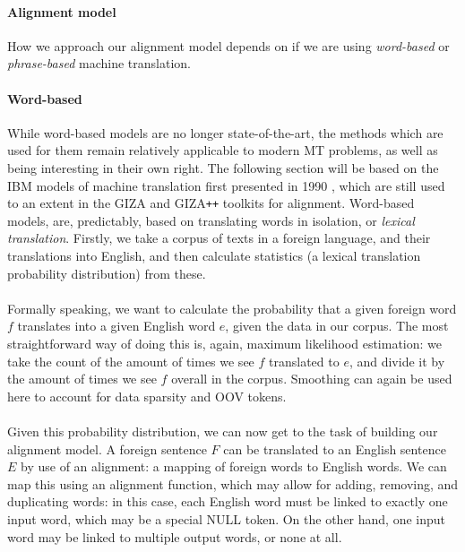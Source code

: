 
 \paragraph{Alignment model}{How we approach our alignment model
   depends on if we are using {\it word-based} or {\it phrase-based}
   machine translation.\cite{smt}}
 \paragraph{Word-based}{While word-based models are no longer
   state-of-the-art, the methods which are used for them remain
   relatively applicable to modern MT problems, as well as being
   interesting in their own right. The following section will be based
   on the IBM models of machine translation first presented in 1990
   \cite{ibm}, which are still used to an extent in the GIZA and
   GIZA\texttt{+}\texttt{+} toolkits for alignment. Word-based models,
   are, predictably, based on translating words in isolation, or {\it
     lexical translation}. Firstly, we take a corpus of texts in a
   foreign language, and their translations into English, and then
   calculate statistics (a lexical translation probability
   distribution) from these.}
 \paragraph{}{Formally speaking, we want to calculate the probability
   that a given foreign word $f$ translates into a given English word
   $e$, given the data in our corpus. The most straightforward way of
   doing this is, again, maximum likelihood estimation: we take the
   count of the amount of times we see $f$ translated to $e$, and
   divide it by the amount of times we see $f$ overall in the
   corpus. Smoothing can again be used here to account for data
   sparsity and OOV tokens.}
 \paragraph{}{Given this probability distribution, we can now get to
   the task of building our alignment model. A foreign sentence $F$
   can be translated to an English sentence $E$ by use of an
   alignment: a mapping of foreign words to English words. We
   can map this using an alignment function, which may allow for
   adding, removing, and duplicating words: in this case, each English
   word must be linked to exactly one input word, which may be a
   special NULL token. On the other hand, one input word may be linked
   to multiple output words, or none at all. \cite{smt}}
